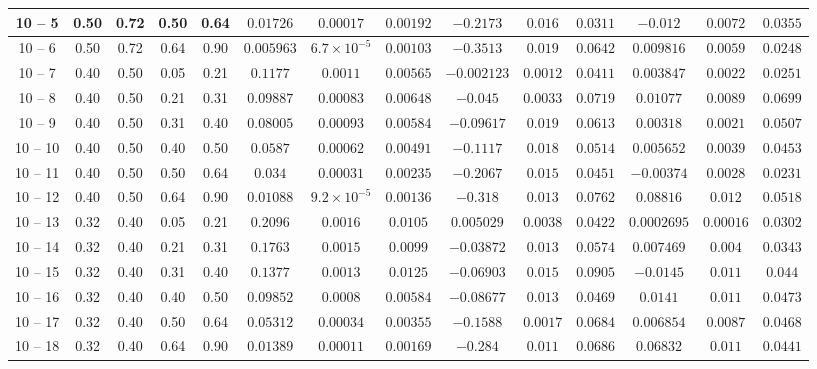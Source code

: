 \begin{longtable}{|*{14}{c|}}
\hline
10 -- 5 & 0.50 & 0.72 & 0.50 & 0.64 & $0.01726$ & $0.00017$ & $0.00192$ & $-0.2173$ & $0.016$ & $0.0311$ & $-0.012$ & $0.0072$ & $0.0355$ \\
\hline
10 -- 6 & 0.50 & 0.72 & 0.64 & 0.90 & $0.005963$ & $6.7\times 10^{-5}$ & $0.00103$ & $-0.3513$ & $0.019$ & $0.0642$ & $0.009816$ & $0.0059$ & $0.0248$ \\
\hline
10 -- 7 & 0.40 & 0.50 & 0.05 & 0.21 & $0.1177$ & $0.0011$ & $0.00565$ & $-0.002123$ & $0.0012$ & $0.0411$ & $0.003847$ & $0.0022$ & $0.0251$ \\
\hline
10 -- 8 & 0.40 & 0.50 & 0.21 & 0.31 & $0.09887$ & $0.00083$ & $0.00648$ & $-0.045$ & $0.0033$ & $0.0719$ & $0.01077$ & $0.0089$ & $0.0699$ \\
\hline
10 -- 9 & 0.40 & 0.50 & 0.31 & 0.40 & $0.08005$ & $0.00093$ & $0.00584$ & $-0.09617$ & $0.019$ & $0.0613$ & $0.00318$ & $0.0021$ & $0.0507$ \\
\hline
10 -- 10 & 0.40 & 0.50 & 0.40 & 0.50 & $0.0587$ & $0.00062$ & $0.00491$ & $-0.1117$ & $0.018$ & $0.0514$ & $0.005652$ & $0.0039$ & $0.0453$ \\
\hline
10 -- 11 & 0.40 & 0.50 & 0.50 & 0.64 & $0.034$ & $0.00031$ & $0.00235$ & $-0.2067$ & $0.015$ & $0.0451$ & $-0.00374$ & $0.0028$ & $0.0231$ \\
\hline
10 -- 12 & 0.40 & 0.50 & 0.64 & 0.90 & $0.01088$ & $9.2\times 10^{-5}$ & $0.00136$ & $-0.318$ & $0.013$ & $0.0762$ & $0.08816$ & $0.012$ & $0.0518$ \\
\hline
10 -- 13 & 0.32 & 0.40 & 0.05 & 0.21 & $0.2096$ & $0.0016$ & $0.0105$ & $0.005029$ & $0.0038$ & $0.0422$ & $0.0002695$ & $0.00016$ & $0.0302$ \\
\hline
10 -- 14 & 0.32 & 0.40 & 0.21 & 0.31 & $0.1763$ & $0.0015$ & $0.0099$ & $-0.03872$ & $0.013$ & $0.0574$ & $0.007469$ & $0.004$ & $0.0343$ \\
\hline
10 -- 15 & 0.32 & 0.40 & 0.31 & 0.40 & $0.1377$ & $0.0013$ & $0.0125$ & $-0.06903$ & $0.015$ & $0.0905$ & $-0.0145$ & $0.011$ & $0.044$ \\
\hline
10 -- 16 & 0.32 & 0.40 & 0.40 & 0.50 & $0.09852$ & $0.0008$ & $0.00584$ & $-0.08677$ & $0.013$ & $0.0469$ & $0.0141$ & $0.011$ & $0.0473$ \\
\hline
10 -- 17 & 0.32 & 0.40 & 0.50 & 0.64 & $0.05312$ & $0.00034$ & $0.00355$ & $-0.1588$ & $0.0017$ & $0.0684$ & $0.006854$ & $0.0087$ & $0.0468$ \\
\hline
10 -- 18 & 0.32 & 0.40 & 0.64 & 0.90 & $0.01389$ & $0.00011$ & $0.00169$ & $-0.284$ & $0.011$ & $0.0686$ & $0.06832$ & $0.011$ & $0.0441$ \\

\end{longtable}
